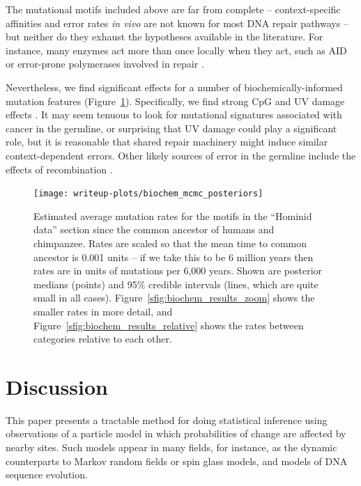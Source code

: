 \documentclass{article}
\theoremstyle{plain}
\theoremstyle{definition}
\begin{document}
The mutational motifs included above are far from complete
-- context-specific affinities and error rates \textit{in vivo}
are not known for most DNA repair pathways --
but neither do they exhaust the hypotheses available in the literature.
For instance, many enzymes act more than once locally when they act,
such as AID \citep{senavirathne2015activationinduced} or error-prone polymerases involved in repair \citep{maul2016polymerase}.

Nevertheless, we find significant effects for a number of biochemically-informed mutation features (Figure~\ref{fig:biochem_results}).
Specifically, we find strong CpG and UV damage effects \citep[][also seen by]{harris2015evidence}.
It may seem tenuous to look for mutational signatures associated with cancer in the germline,
or surprising that UV damage could play a significant role,
but it is reasonable that shared repair machinery might induce similar context-dependent errors.
Other likely sources of error in the germline include the effects of recombination
\citep{arbeithuber2015crossovers,myers2010drive}.


\begin{figure}
    \begin{center}
        \texttt{[image: writeup-plots/biochem\_mcmc\_posteriors]}
    \end{center}
    \caption{
        Estimated average mutation rates
        for the motifs in the ``Hominid data'' section
        since the common ancestor of humans and chimpanzee.
        Rates are scaled so that the mean time to common ancestor is 0.001 units --
        if we take this to be 6 million years \citep{scally2012insights,langergraber2012generation}
        then rates are in units of mutations per 6,000 years.
        Shown are posterior medians (points) and 95\% credible intervals (lines, which are quite small in all cases).
        Figure~\ref{sfig:biochem_results_zoom} shows the smaller rates in more detail,
        and Figure~\ref{sfig:biochem_results_relative} shows the rates between categories relative to each other.
        \label{fig:biochem_results}}
\end{figure}

\section{Discussion}

This paper presents a tractable method
for doing statistical inference using observations of a particle model
in which probabilities of change are affected by nearby sites.
Such models appear in many fields, for instance,
as the dynamic counterparts to Markov random fields or spin glass models,
and models of DNA sequence evolution.
\end{document}
